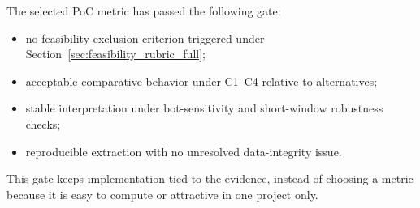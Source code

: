 The selected PoC metric has passed the following gate:
\begin{itemize}[leftmargin=*]
  \item no feasibility exclusion criterion triggered under Section~\ref{sec:feasibility_rubric_full};
  \item acceptable comparative behavior under C1--C4 relative to alternatives;
  \item stable interpretation under bot-sensitivity and short-window robustness checks;
  \item reproducible extraction with no unresolved data-integrity issue.
\end{itemize}

This gate keeps implementation tied to the evidence, instead of choosing a metric because it is easy to compute
or attractive in one project only.
